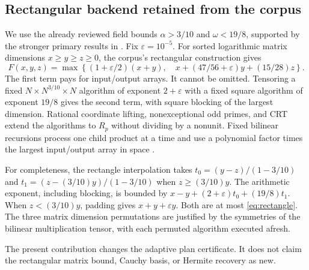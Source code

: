 \subsection{Rectangular backend retained from the corpus}

We use the already reviewed field bounds $\alpha>3/10$ and $\omega<19/8$,
supported by the stronger primary results in \cite{matrix}. Fix
$\varepsilon=10^{-5}$. For sorted logarithmic matrix dimensions
$x\ge y\ge z\ge0$, the corpus's rectangular construction gives
\begin{equation}\label{eq:rectangle}
 F(x,y,z)=\max\left\{
 (1+\varepsilon/2)(x+y),\quad
 x+(47/56+\varepsilon)y+(15/28)z\right\}.
\end{equation}
The first term pays for input/output arrays. It cannot be omitted.
Tensoring a fixed $N\times N^{3/10}\times N$ algorithm of exponent
$2+\varepsilon$ with a fixed square algorithm of exponent $19/8$ gives
the second term, with square blocking of the largest dimension. Rational
coordinate lifting, nonexceptional odd primes, and CRT extend the algorithms
to $R_p$ without dividing by a nonunit. Fixed bilinear recursions process one
child product at a time and use a polynomial factor times the largest
input/output array in space \cite{rectangular}.

For completeness, the rectangle interpolation takes
$t_0=(y-z)/(1-3/10)$ and $t_1=(z-(3/10)y)/(1-3/10)$ when
$z\ge(3/10)y$. The arithmetic exponent, including blocking, is bounded by
$x-y+(2+\varepsilon)t_0+(19/8)t_1$.
When $z<(3/10)y$, padding gives $x+y+\varepsilon y$.
Both are at most \eqref{eq:rectangle}. The three matrix dimension
permutations are justified by the symmetries of the bilinear multiplication
tensor, with each permuted algorithm executed afresh.

The present contribution changes the adaptive plan certificate. It does not
claim the rectangular matrix bound, Cauchy basis, or Hermite recovery as new.
